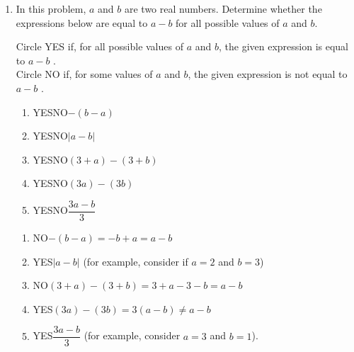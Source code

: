 \documentclass{article}
\begin{document}
\begin{enumerate}
\begin{enumerate}
\begin{enumerate}
                        
                \begin{solution}
                    \begin{align*}
                        & = \dfrac{\dfrac{1}{3+b} \Big( \dfrac{3}{3}\Big) -\dfrac{1}{3} \Big(\dfrac{3+b}{3+b}\Big)}{b} \\
                        & = \dfrac{\dfrac{3}{9+3b}-\dfrac{3+b}{9+3b}}{b} \\
                        & = \dfrac{\dfrac{-b}{9+3b}}{b} \\
                        & = \dfrac{-b}{9 + 3b} \cdot \dfrac{1}{b} = -\dfrac{1}{9+3b} \\
                    \end{align*}
                \end{solution}
                         
                    \end{enumerate}
               \item In this problem, $a$ and $b$ are two real numbers. Determine whether the expressions below are equal to $a-b$ for all possible values of $a$ and $b$.
               
               Circle YES if, for all possible values of $a$ and $b$, the given expression is equal to $a-b$ . \\
               Circle NO if, for some values of $a$ and $b$, the given expression is not equal to $a-b$ .

    
  \begin{enumerate}
      \item[] YES\;\;\;\;\;\;\;NO\;\;\;\;\;\;\;$-(b-a)$
      \item[] YES\;\;\;\;\;\;\;NO\;\;\;\;\;\;\;$|a-b|$
      \item[] YES\;\;\;\;\;\;\;NO\;\;\;\;\;\;\;$(3+a)-(3+b)$
      \item[] YES\;\;\;\;\;\;\;NO\;\;\;\;\;\;\;$(3a)-(3b)$
      \item[] YES\;\;\;\;\;\;\;NO\;\;\;\;\;\;\;$\dfrac{3a-b}{3}$

\end{enumerate}

      \begin{solution}
      \begin{enumerate}
      \item[] \;\;\;\;\;\;\;NO\;\;\;\;\;\;\;$-(b-a) = -b+a = a-b$ 
      \item[] YES\;\;\;\;\;\;\;\;\;\;\;\;\;\;$|a-b|$ (for example, consider if $a=2$ and $b=3$)
      \item[] \;\;\;\;\;\;\;NO\;\;\;\;\;\;\;$(3+a)-(3+b)= 3+a - 3 - b = a - b$
      \item[] YES\;\;\;\;\;\;\;\;\;\;\;\;\;\;$(3a)-(3b) = 3(a-b) \neq a - b$
      \item[] YES\;\;\;\;\;\;\;\;\;\;\;\;\;\;$\dfrac{3a-b}{3}$ (for example, consider $a=3$ and $b=1$).


\end{enumerate}
\end{solution}
\end{enumerate}
\end{enumerate}
\end{document}
